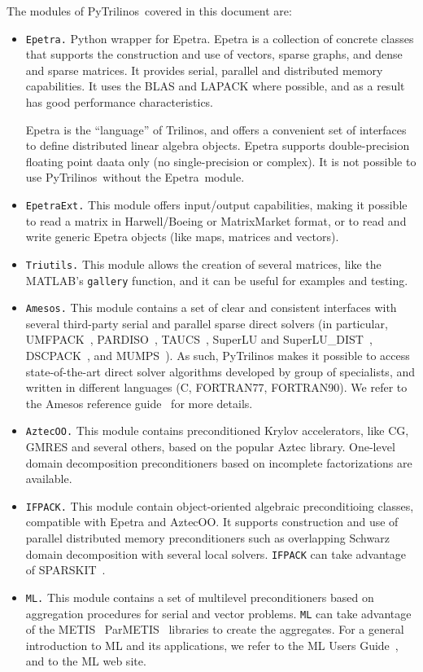 \documentclass[10pt,relax]{SANDreport}
\newcommand{\PyTrilinos}{{PyTrilinos}}
\newcommand{\epetra}{{Epetra}}
\begin{document}
The modules of \PyTrilinos\ covered in this document are:
\begin{itemize}
\item {\tt Epetra.} Python wrapper for Epetra. Epetra is a collection
of concrete classes that supports the construction and use of vectors, sparse
graphs, and dense and sparse matrices. It provides serial, parallel and
distributed memory capabilities. It uses the BLAS and LAPACK where possible,
  and as a result has good performance characteristics.

Epetra is the
``language'' of Trilinos, and offers a convenient set of interfaces to define
distributed linear algebra objects. Epetra supports double-precision floating
point daata only (no single-precision or complex). 
It is not possible to use \PyTrilinos\ without the \epetra\ module.
%
\item {\tt EpetraExt.} This module offers input/output
capabilities, making it possible to read a matrix in Harwell/Boeing or
MatrixMarket format, or to read and write generic Epetra objects 
(like maps, matrices and vectors).
%
\item {\tt Triutils.} This module allows the creation of several matrices, 
  like the MATLAB's {\tt gallery} function, and it can be useful for examples
  and testing.
%
\item {\tt Amesos.} This module contains a set of clear and consistent
interfaces with several third-party serial and parallel sparse direct solvers
(in particular,
UMFPACK~\cite{umfpack-manual},
PARDISO~\cite{pardiso-manual},
TAUCS~\cite{taucs-manual},
SuperLU and SuperLU\_DIST~\cite{superlu-manual},
DSCPACK~\cite{dscpack-manual}, and 
MUMPS~\cite{mumps-manual}). As such, PyTrilinos makes it possible to access
state-of-the-art direct solver algorithms developed by group of specialists,
  and written in different languages (C, FORTRAN77, FORTRAN90).
We refer to the Amesos reference guide~\cite{Amesos-Reference-Guide} for more details.
%
\item {\tt AztecOO.} This module contains preconditioned Krylov accelerators,
  like CG, GMRES and several others, based on the popular Aztec library.
  One-level domain decomposition preconditioners based on incomplete
  factorizations are available.
%
\item {\tt IFPACK.} This module contain object-oriented algebraic preconditioing
classes, compatible with Epetra and AztecOO.
It supports construction and use of parallel distributed memory preconditioners
such as overlapping Schwarz domain decomposition with several local solvers.
{\tt IFPACK} can take advantage of SPARSKIT~\cite{sparskit}.
%
\item {\tt ML.} This module contains a set of multilevel preconditioners based
on aggregation procedures for serial and vector problems. {\tt ML} can take
advantage of the 
METIS~\cite{metis}
ParMETIS~\cite{parmetis} libraries to create the aggregates.
For a general introduction to ML and its applications, we refer to
the ML Users Guide~\cite{ml-guide}, and to the ML web site.
\end{itemize}
\end{document}
